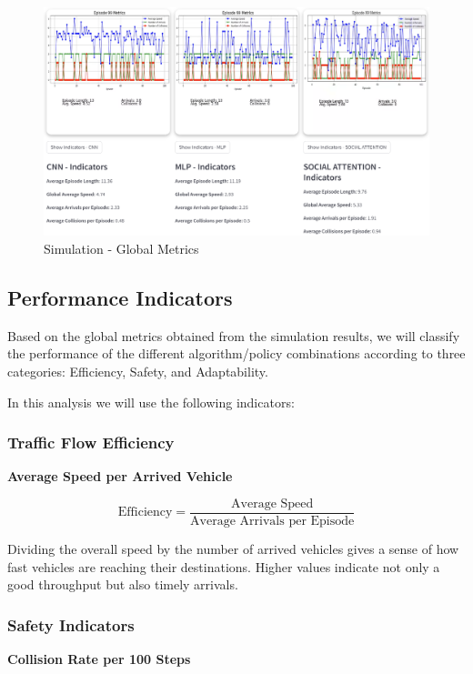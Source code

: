 \begin{figure}[H]
    \centering
    \includegraphics[height=0.4\textheight]{images/app_global_metrics.png} 
    \caption{Simulation - Global Metrics}
\end{figure}


\subsection{Performance Indicators}

Based on the global metrics obtained from the simulation results, we will classify the performance of the different algorithm/policy combinations according to three categories: Efficiency, Safety, and Adaptability. 

In this analysis we will use the following indicators:

\subsubsection{Traffic Flow Efficiency}

\textbf{Average Speed per Arrived Vehicle} 

\[
\text{Efficiency} = \frac{\text{Average Speed}}{\text{Average Arrivals per Episode}}
\]

Dividing the overall speed by the number of arrived vehicles gives a sense of how fast vehicles are reaching their destinations. Higher values indicate not only a good throughput but also timely arrivals.

\subsubsection{Safety Indicators}

\textbf{Collision Rate per 100 Steps} 

